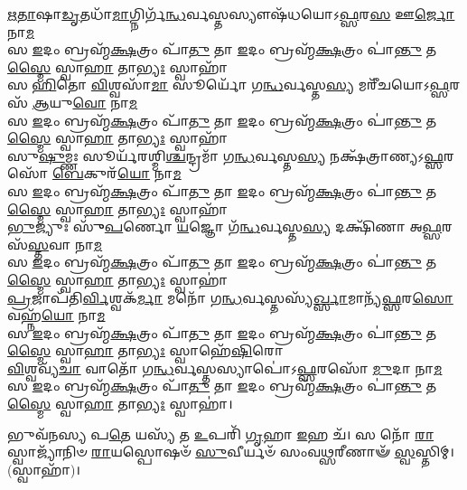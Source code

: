 \-\ul{𑌋}\-\-\ul{𑌤𑌾}\-𑌷𑌾\-\ul{𑌡𑍃}\-𑌤𑌧𑌾᳴\-\ul{𑌮𑌾}\-𑌗𑍍𑌨𑌿𑌰𑍍𑌗᳴\-\ul{𑌨𑍍𑌧}\-𑌰𑍍𑌵𑌸𑍍𑌤𑌸𑍍𑌯𑍗𑌷᳴𑌧𑌯𑍋𑌽\-\ul{𑌫𑍍𑌸}\-𑌰\-\ul{𑌸} 𑌊\-\ul{𑌰𑍍𑌜𑍋} 𑌨𑌾\-\ul{𑌮}\-\\
𑌸 \ul{𑌇}\-𑌦𑌂 𑌬𑍍𑌰𑌹𑍍𑌮᳴\-\ul{𑌕𑍍𑌷}\-𑌤𑍍𑌰𑌂 𑌪𑌾᳴\-\ul{𑌤𑍁} 𑌤𑌾 \ul{𑌇}\-𑌦𑌂 𑌬𑍍𑌰𑌹𑍍𑌮᳴\-\ul{𑌕𑍍𑌷}\-𑌤𑍍𑌰𑌂 𑌪𑌾॑\-\ul{𑌨𑍍𑌤𑍁} 𑌤\-\ul{𑌸𑍍𑌮𑍈} 𑌸𑍍𑌵𑌾\-\ul{𑌹𑌾} 𑌤𑌾\-\ul{𑌭𑍍𑌯𑌃} 𑌸𑍍𑌵𑌾𑌹𑌾᳴\\
𑌸\-\ul{𑌹𑌿}\-𑌤𑍋 \ul{𑌵𑌿}\-𑌶𑍍𑌵𑌸𑌾᳴\-\ul{𑌮𑌾} 𑌸𑍂𑌰𑍍𑌯𑍋᳴ 𑌗\-\ul{𑌨𑍍𑌧}\-𑌰𑍍𑌵𑌸𑍍𑌤\-\ul{𑌸𑍍𑌯} 𑌮𑌰𑍀᳴𑌚𑌯𑍋𑌽\-\ul{𑌫𑍍𑌸}\-𑌰𑌸᳴ \ul{𑌆}\-𑌯𑍁\-\ul{𑌵𑍋} 𑌨𑌾\-\ul{𑌮}\-\\
𑌸 \ul{𑌇}\-𑌦𑌂 𑌬𑍍𑌰𑌹𑍍𑌮᳴\-\ul{𑌕𑍍𑌷}\-𑌤𑍍𑌰𑌂 𑌪𑌾᳴\-\ul{𑌤𑍁} 𑌤𑌾 \ul{𑌇}\-𑌦𑌂 𑌬𑍍𑌰𑌹𑍍𑌮᳴\-\ul{𑌕𑍍𑌷}\-𑌤𑍍𑌰𑌂 𑌪𑌾॑\-\ul{𑌨𑍍𑌤𑍁} 𑌤\-\ul{𑌸𑍍𑌮𑍈} 𑌸𑍍𑌵𑌾\-\ul{𑌹𑌾} 𑌤𑌾\-\ul{𑌭𑍍𑌯𑌃} 𑌸𑍍𑌵𑌾𑌹𑌾᳴\\
𑌸𑍁\-\ul{𑌷𑍁}\-𑌮𑍍𑌣𑌃 𑌸𑍂𑌰𑍍𑌯᳴𑌰𑌶𑍍𑌮𑌿\-\ul{𑌶𑍍𑌚}\-𑌨𑍍𑌦𑍍𑌰𑌮𑌾᳴ 𑌗\-\ul{𑌨𑍍𑌧}\-𑌰𑍍𑌵𑌸𑍍𑌤\-\ul{𑌸𑍍𑌯} 𑌨𑌕𑍍𑌷᳴𑌤𑍍𑌰𑌾𑌣𑍍𑌯𑌽\-\ul{𑌫𑍍𑌸}\-𑌰𑌸𑍋᳴ \ul{𑌬𑍇}\-𑌕𑍁𑌰᳴\-\ul{𑌯𑍋} 𑌨𑌾\-\ul{𑌮}\-\\
𑌸 \ul{𑌇}\-𑌦𑌂 𑌬𑍍𑌰𑌹𑍍𑌮᳴\-\ul{𑌕𑍍𑌷}\-𑌤𑍍𑌰𑌂 𑌪𑌾᳴\-\ul{𑌤𑍁} 𑌤𑌾 \ul{𑌇}\-𑌦𑌂 𑌬𑍍𑌰𑌹𑍍𑌮᳴\-\ul{𑌕𑍍𑌷}\-𑌤𑍍𑌰𑌂 𑌪𑌾॑\-\ul{𑌨𑍍𑌤𑍁} 𑌤\-\ul{𑌸𑍍𑌮𑍈} 𑌸𑍍𑌵𑌾\-\ul{𑌹𑌾} 𑌤𑌾\-\ul{𑌭𑍍𑌯𑌃} 𑌸𑍍𑌵𑌾𑌹𑌾᳴\\
\-\ul{𑌭𑍁}\-𑌜𑍍𑌯𑍁𑌃 𑌸𑍁𑍁᳴\-\ul{𑌪}\-𑌰𑍍𑌣𑍋 \ul{𑌯}\-𑌜𑍍𑌞𑍋 𑌗᳴\-\ul{𑌨𑍍𑌧}\-𑌰𑍍𑌵𑌸𑍍𑌤\-\ul{𑌸𑍍𑌯} 𑌦𑌕𑍍𑌷𑌿᳴𑌣𑌾 𑌅\-\ul{𑌫𑍍𑌸}\-𑌰𑌸᳴\-\ul{𑌸𑍍𑌤}\-𑌵𑌾 𑌨𑌾\-\ul{𑌮}\-\\
𑌸 \ul{𑌇}\-𑌦𑌂 𑌬𑍍𑌰𑌹𑍍𑌮᳴\-\ul{𑌕𑍍𑌷}\-𑌤𑍍𑌰𑌂 𑌪𑌾᳴\-\ul{𑌤𑍁} 𑌤𑌾 \ul{𑌇}\-𑌦𑌂 𑌬𑍍𑌰𑌹𑍍𑌮᳴\-\ul{𑌕𑍍𑌷}\-𑌤𑍍𑌰𑌂 𑌪𑌾॑\-\ul{𑌨𑍍𑌤𑍁} 𑌤\-\ul{𑌸𑍍𑌮𑍈} 𑌸𑍍𑌵𑌾\-\ul{𑌹𑌾} 𑌤𑌾\-\ul{𑌭𑍍𑌯𑌃} 𑌸𑍍𑌵𑌾𑌹𑌾॑\\
\-\ul{𑌪𑍍𑌰}\-𑌜𑌾𑌪᳴𑌤𑌿\-\ul{𑌰𑍍𑌵𑌿}\-𑌶𑍍𑌵𑌕᳴\-\ul{𑌰𑍍𑌮𑌾} 𑌮𑌨𑍋᳴ 𑌗\-\ul{𑌨𑍍𑌧}\-𑌰𑍍𑌵𑌸𑍍𑌤𑌸𑍍𑌯᳴\-\ul{𑌰𑍍𑌖𑍍𑌸𑌾}\-𑌮𑌾𑌨𑍍𑌯᳴\-\ul{𑌫𑍍𑌸}\-𑌰\-\ul{𑌸𑍋} 𑌵𑌹𑍍𑌨᳴\-\ul{𑌯𑍋}  𑌨𑌾\-\ul{𑌮}\-\\
𑌸 \ul{𑌇}\-𑌦𑌂 𑌬𑍍𑌰𑌹𑍍𑌮᳴\-\ul{𑌕𑍍𑌷}\-𑌤𑍍𑌰𑌂 𑌪𑌾᳴\-\ul{𑌤𑍁} 𑌤𑌾 \ul{𑌇}\-𑌦𑌂 𑌬𑍍𑌰𑌹𑍍𑌮᳴\-\ul{𑌕𑍍𑌷}\-𑌤𑍍𑌰𑌂 𑌪𑌾॑\-\ul{𑌨𑍍𑌤𑍁} 𑌤\-\ul{𑌸𑍍𑌮𑍈} 𑌸𑍍𑌵𑌾\-\ul{𑌹𑌾} 𑌤𑌾\-\ul{𑌭𑍍𑌯𑌃} 𑌸𑍍𑌵𑌾𑌹𑍇᳴\-\ul{𑌷𑌿}\-𑌰𑍋\\
\-\ul{𑌵𑌿}\-𑌶𑍍𑌵𑌵𑍍𑌯᳴\-\ul{𑌚𑌾} 𑌵𑌾𑌤𑍋᳴ 𑌗\-\ul{𑌨𑍍𑌧}\-𑌰𑍍𑌵𑌸𑍍𑌤𑌸𑍍𑌯𑌾𑌪𑍋॑𑌽\-\ul{𑌫𑍍𑌸}\-𑌰𑌸𑍋᳴ \ul{𑌮𑍁}\-𑌦𑌾 𑌨𑌾\-\ul{𑌮}\-\\
𑌸 \ul{𑌇}\-𑌦𑌂 𑌬𑍍𑌰𑌹𑍍𑌮᳴\-\ul{𑌕𑍍𑌷}\-𑌤𑍍𑌰𑌂 𑌪𑌾᳴\-\ul{𑌤𑍁} 𑌤𑌾 \ul{𑌇}\-𑌦𑌂 𑌬𑍍𑌰𑌹𑍍𑌮᳴\-\ul{𑌕𑍍𑌷}\-𑌤𑍍𑌰𑌂 𑌪𑌾॑\-\ul{𑌨𑍍𑌤𑍁} 𑌤\-\ul{𑌸𑍍𑌮𑍈} 𑌸𑍍𑌵𑌾\-\ul{𑌹𑌾} 𑌤𑌾\-\ul{𑌭𑍍𑌯𑌃} 𑌸𑍍𑌵𑌾𑌹𑌾॑।

𑌭𑍁𑌵᳴𑌨𑌸𑍍𑌯 𑌪\-\ul{𑌤𑍇} 𑌯𑌸𑍍𑌯᳴ 𑌤 \ul{𑌉}\-𑌪𑌰𑌿᳴ \ul{𑌗𑍃}\-𑌹𑌾 \ul{𑌇}\-𑌹 𑌚᳴।
𑌸 𑌨𑍋᳴ \ul{𑌰𑌾}\-𑌸𑍍𑌵𑌾𑌜𑍍𑌯𑌾᳴𑌨𑌿𑍞 \ul{𑌰𑌾}\-𑌯𑌸𑍍𑌪𑍋𑌷𑍞᳴ \ul{𑌸𑍁}\-𑌵𑍀𑌰𑍍𑌯𑍞᳴ 𑌸𑌂𑌵\-\ul{𑌥𑍍𑌸}\-𑌰𑍀𑌣𑌾𑍟᳴ \ul{𑌸𑍍𑌵}\-𑌸𑍍𑌤𑌿𑌮𑍍। (𑌸𑍍𑌵𑌾𑌹𑌾᳴)।

